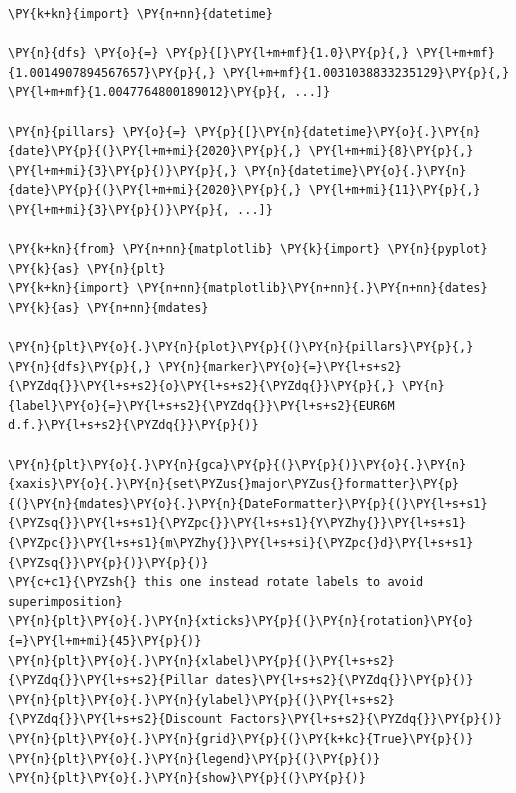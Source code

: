\begin{Answer}
\begin{tcolorbox}[size=fbox, boxrule=1pt, colback=cellbackground, colframe=cellborder]
\begin{Verbatim}[commandchars=\\\{\}]
\PY{k+kn}{import} \PY{n+nn}{datetime}

\PY{n}{dfs} \PY{o}{=} \PY{p}{[}\PY{l+m+mf}{1.0}\PY{p}{,} \PY{l+m+mf}{1.0014907894567657}\PY{p}{,} \PY{l+m+mf}{1.0031038833235129}\PY{p}{,} \PY{l+m+mf}{1.0047764800189012}\PY{p}{, ...]}
       
\PY{n}{pillars} \PY{o}{=} \PY{p}{[}\PY{n}{datetime}\PY{o}{.}\PY{n}{date}\PY{p}{(}\PY{l+m+mi}{2020}\PY{p}{,} \PY{l+m+mi}{8}\PY{p}{,} \PY{l+m+mi}{3}\PY{p}{)}\PY{p}{,} \PY{n}{datetime}\PY{o}{.}\PY{n}{date}\PY{p}{(}\PY{l+m+mi}{2020}\PY{p}{,} \PY{l+m+mi}{11}\PY{p}{,} \PY{l+m+mi}{3}\PY{p}{)}\PY{p}{, ...]}

\PY{k+kn}{from} \PY{n+nn}{matplotlib} \PY{k}{import} \PY{n}{pyplot} \PY{k}{as} \PY{n}{plt}
\PY{k+kn}{import} \PY{n+nn}{matplotlib}\PY{n+nn}{.}\PY{n+nn}{dates} \PY{k}{as} \PY{n+nn}{mdates}

\PY{n}{plt}\PY{o}{.}\PY{n}{plot}\PY{p}{(}\PY{n}{pillars}\PY{p}{,} \PY{n}{dfs}\PY{p}{,} \PY{n}{marker}\PY{o}{=}\PY{l+s+s2}{\PYZdq{}}\PY{l+s+s2}{o}\PY{l+s+s2}{\PYZdq{}}\PY{p}{,} \PY{n}{label}\PY{o}{=}\PY{l+s+s2}{\PYZdq{}}\PY{l+s+s2}{EUR6M d.f.}\PY{l+s+s2}{\PYZdq{}}\PY{p}{)}

\PY{n}{plt}\PY{o}{.}\PY{n}{gca}\PY{p}{(}\PY{p}{)}\PY{o}{.}\PY{n}{xaxis}\PY{o}{.}\PY{n}{set\PYZus{}major\PYZus{}formatter}\PY{p}{(}\PY{n}{mdates}\PY{o}{.}\PY{n}{DateFormatter}\PY{p}{(}\PY{l+s+s1}{\PYZsq{}}\PY{l+s+s1}{\PYZpc{}}\PY{l+s+s1}{Y\PYZhy{}}\PY{l+s+s1}{\PYZpc{}}\PY{l+s+s1}{m\PYZhy{}}\PY{l+s+si}{\PYZpc{}d}\PY{l+s+s1}{\PYZsq{}}\PY{p}{)}\PY{p}{)}
\PY{c+c1}{\PYZsh{} this one instead rotate labels to avoid superimposition}
\PY{n}{plt}\PY{o}{.}\PY{n}{xticks}\PY{p}{(}\PY{n}{rotation}\PY{o}{=}\PY{l+m+mi}{45}\PY{p}{)}
\PY{n}{plt}\PY{o}{.}\PY{n}{xlabel}\PY{p}{(}\PY{l+s+s2}{\PYZdq{}}\PY{l+s+s2}{Pillar dates}\PY{l+s+s2}{\PYZdq{}}\PY{p}{)}
\PY{n}{plt}\PY{o}{.}\PY{n}{ylabel}\PY{p}{(}\PY{l+s+s2}{\PYZdq{}}\PY{l+s+s2}{Discount Factors}\PY{l+s+s2}{\PYZdq{}}\PY{p}{)}
\PY{n}{plt}\PY{o}{.}\PY{n}{grid}\PY{p}{(}\PY{k+kc}{True}\PY{p}{)}
\PY{n}{plt}\PY{o}{.}\PY{n}{legend}\PY{p}{(}\PY{p}{)}
\PY{n}{plt}\PY{o}{.}\PY{n}{show}\PY{p}{(}\PY{p}{)}
\end{Verbatim}
\end{tcolorbox}


\end{Answer}
